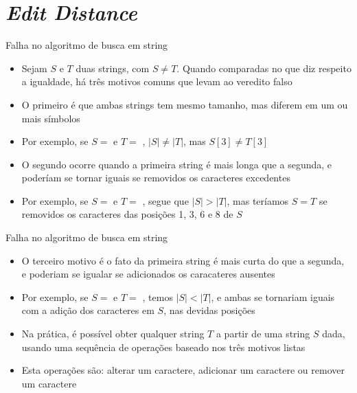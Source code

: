 \section{\it Edit Distance}

\begin{frame}[fragile]{Falha no algoritmo de busca em string}

    \begin{itemize}
        \item  Sejam $S$ e $T$ duas strings, com $S \neq T$. Quando comparadas no que diz respeito
            a igualdade, há três motivos comuns que levam ao veredito falso 

        \item O primeiro é que ambas strings tem mesmo tamanho, mas diferem em um ou mais símbolos

        \item Por exemplo, se $S = $  e $T = $ , 
            $|S|\neq |T|$, mas $S[3] \neq T[3]$

        \item O segundo ocorre quando a primeira string é mais longa que a segunda, e poderíam se 
            tornar iguais se removidos os caracteres excedentes

        \item Por exemplo, se $S = $  e $T = $ , segue que
            $|S| > |T|$, mas teríamos $S = T$ se removidos os caracteres das posições 
            1, 3, 6 e 8 de $S$
    \end{itemize}

\end{frame}

\begin{frame}[fragile]{Falha no algoritmo de busca em string}

    \begin{itemize}
        \item O terceiro motivo é o fato da primeira string é mais curta do que a segunda, e 
            poderiam se igualar se adicionados os caracateres ausentes

        \item Por exemplo, se $S = $  e $T = $ , temos
            $|S| < |T|$, e ambas se tornariam iguais com a adição dos caracteres 
                 em $S$, nas devidas posições

        \item Na prática, é possível obter qualquer string $T$ a partir de uma string $S$ dada, 
            usando uma sequência de operações baseado nos três motivos listas

        \item Esta operações são: alterar um caractere, adicionar um caractere ou remover um caractere
    \end{itemize}

\end{frame}

